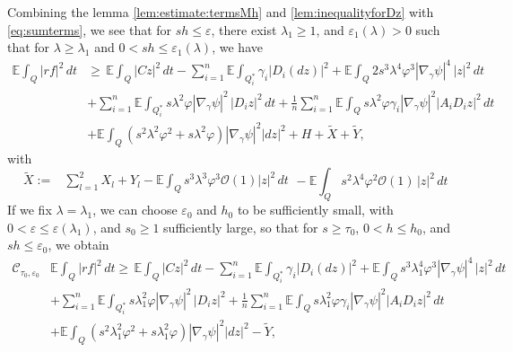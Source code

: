 \documentclass[11pt,oneside,leqno]{amsart}
\numberwithin{equation}{section}
\numberwithin{equation}{section}
\newcommand{\E}{\mathbb{E}}
\begin{document}
Combining the lemma \ref{lem:estimate:termsMh} and \ref{lem:inequalityforDz} with \eqref{eq:sumterms}, we see that for $sh\leq \varepsilon$, there exist $\lambda_{1}\geq 1$, and $\varepsilon_{1}(\lambda)>0$ such that for $\lambda\geq \lambda_{1}$ and $0<sh\leq \varepsilon_{1}(\lambda)$, we have
\begin{equation}\label{eq:conmutador}
\begin{split}
\E\int_{Q}|rf|^2\,dt&\geq\,\E\int_{Q}|Cz|^2\,dt-\sum_{i=1}^{n}\E\int_{Q_{i}^{\ast}}\gamma_i|D_i(dz)|^2+\E\int_{Q}2s^{3}\lambda^{4}\varphi^{3}|\nabla_{\gamma}\psi|^{4}\,|z|^{2}\,dt\\
   &+ \sum_{i=1}^{n}\E\int_{Q_{i}^{\ast}}s\lambda^{2}\varphi|\nabla_{\gamma}\psi|^{2}\,|D_{i}z|^{2}\,dt+\frac{1}{n}\sum_{i=1}^{n}\E\int_{Q} s\lambda^2\varphi \gamma_i|\nabla_{\gamma}\psi|^2|A_iD_iz|^2\,dt\\
   &+\E\int_{Q}(s^2\lambda^2\varphi^2+s\lambda^2\varphi)|\nabla_{\gamma} \psi|^2|dz|^2+H+\tilde{X}+\tilde{Y},
   \end{split}
\end{equation}
with
\begin{equation}
\begin{split}
\tilde{X}:=&\sum_{l=1}^{2}X_{l}+Y_{l}-\E\int_{Q}s^{3}\lambda^{3}\varphi^{3}\mathcal{O}(1)|z|^{2}\,dt
    \end{split}-\E\int_{Q}s^2\lambda^4\varphi^2\mathcal{O}(1)\,|z|^2\,dt
\end{equation}
If we fix $\lambda=\lambda_{1}$, we can choose $\varepsilon_{0}$ and $h_{0}$ to be sufficiently small, with $0<\varepsilon \leq \varepsilon(\lambda_{1})$, and $s_{0}\geq 1$ sufficiently large, so that for $s\geq \tau_{0}$, $0<h\leq h_{0}$, and $sh\leq \varepsilon_{0}$, we obtain 
\begin{equation}\label{eq:firstestimate}
\begin{split}
\mathcal{C}_{\tau_{0},\varepsilon_0}&\E\int_{Q}|rf|^2\,dt\geq\,\E\int_{Q}|Cz|^2\,dt-\sum_{i=1}^{n}\E\int_{Q_i^{\ast}}\gamma_i|D_i(dz)|^2+\E\int_{Q}s^{3}\lambda^{4}_{1}\varphi^{3}|\nabla_{\gamma}\psi|^{4}\,|z|^{2}\,dt\\
    &+ \sum_{i=1}^{n}\E\int_{Q_{i}^{\ast}}s\lambda^{2}_{1}\varphi|\nabla_{\gamma}\psi|^{2}\,|D_{i}z|^{2}+\frac{1}{n}\sum_{i=1}^{n}\E\int_{Q} s\lambda_{1}^2\varphi \gamma_i|\nabla_{\gamma}\psi|^2|A_iD_iz|^2\,dt\\
    &+\E\int_{Q}(s^2\lambda_{1}^2\varphi^2+s\lambda_{1}^2\varphi)|\nabla_{\gamma} \psi|^2|dz|^2-\tilde{Y},
    \end{split}
\end{equation}
\end{document}
